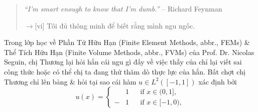 \documentclass[12pt,twoside]{book}
\begin{document}
\begin{quote}
	{\it``I'm smart enough to know that I'm dumb.''} -- {\sc Richard Feynman}
	
	{\sf[en]$\to$[vi]} Tôi đủ thông minh để biết rằng mình ngu ngốc.
\end{quote}
Trong lớp học về Phần Tử Hữu Hạn (Finite Element Methods, abbr., FEMs) \& Thể Tích Hữu Hạn (Finite Volume Methods, abbr., FVMs) của Prof. Dr. {\sc Nicolas Seguin}, chị Thương lại hỏi hắn cái ngu gì đấy về việc thầy của chỉ lại viết sai công thức hoặc có thể chị ta đang thử thăm dò thực lực của hắn. Bất chợt chị Thương chỉ lên bảng \& hỏi tại sao cái hàm $u\in L^2([-1,1])$ xác định bởi
\begin{equation*}
	u(x) = \left\{\begin{split}
		&1&&\mbox{if } x\in(0,1],\\
		-&1&&\mbox{if } x\in[-1,0),
	\end{split}\right.
\end{equation*}
\end{document}

